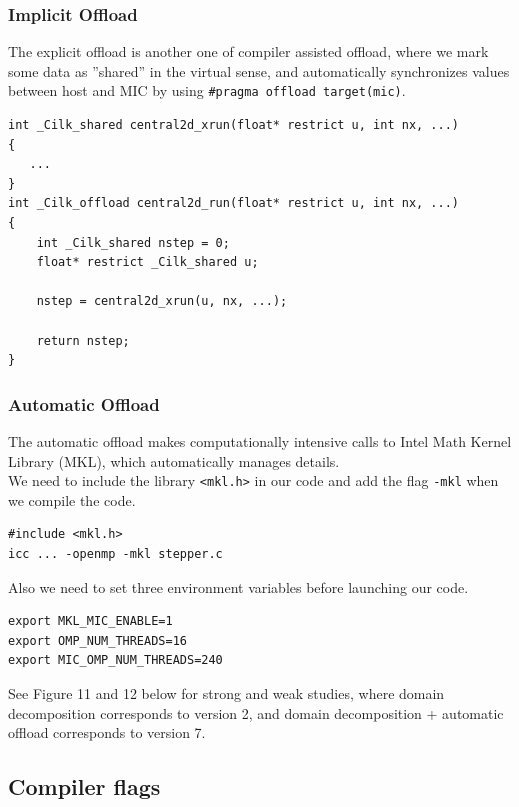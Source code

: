 \documentclass[12pt]{article}
\numberwithin{equation}{section}
\begin{document}
\subsubsection{Implicit Offload}

\normalsize
The explicit offload is another one of compiler assisted offload, where we mark some data as ''shared'' in the virtual sense, and automatically synchronizes values between host and MIC by using \texttt{\#pragma offload target(mic)}.

\scriptsize
\begin{lstlisting}
int _Cilk_shared central2d_xrun(float* restrict u, int nx, ...)
{
   ...
}
int _Cilk_offload central2d_run(float* restrict u, int nx, ...)
{
    int _Cilk_shared nstep = 0;
    float* restrict _Cilk_shared u;

    nstep = central2d_xrun(u, nx, ...);

    return nstep;
}
\end{lstlisting}

\subsubsection{Automatic Offload}

\normalsize
The automatic offload makes computationally intensive calls to Intel Math Kernel Library (MKL), which automatically manages details.
\\
We need to include the library \texttt{<mkl.h>} in our code and add the flag \texttt{-mkl} when we compile the code.

\scriptsize
\begin{lstlisting}
#include <mkl.h>
icc ... -openmp -mkl stepper.c
\end{lstlisting}
\normalsize
Also we need to set three environment variables before launching our code.

\scriptsize
\begin{lstlisting}
export MKL_MIC_ENABLE=1
export OMP_NUM_THREADS=16
export MIC_OMP_NUM_THREADS=240
\end{lstlisting}
\normalsize
See Figure 11 and 12 below for strong and weak studies, where domain decomposition corresponds to version 2, and domain decomposition + automatic offload corresponds to version 7.

\subsection{Compiler flags}
\end{document}
